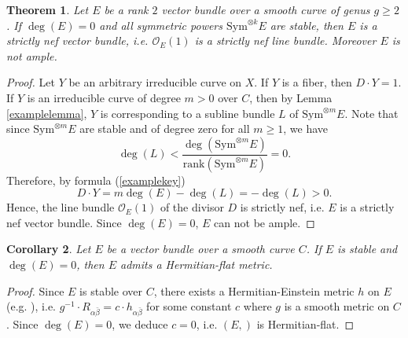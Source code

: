 \documentclass[english,reqno]{amsart}
\newcommand\sO{{\mathscr O}}
\theoremstyle{plain}
\newtheorem{thm}{Theorem}[section]
\newtheorem{cor}[thm]{Corollary}
\theoremstyle{definition}
\numberwithin{equation}{section} %
\begin{document}
\begin{thm}\cite[Chapter I, Example~ 10.6]{Hartshorne1970} Let $E$ be a rank $2$ vector bundle over a smooth curve of genus $g\geq 2$. If $\deg(E)=0$ and  all symmetric powers $ \mathrm{Sym}^{\otimes k} E$ are stable, then $E$ is a strictly nef vector bundle, i.e. $\sO_E(1)$ is a strictly nef line bundle.  Moreover $E$ is not ample.
    \end{thm}
\begin{proof}
Let $Y$ be an arbitrary irreducible curve on $X$. If $Y$
is a fiber, then $D\cdot Y=1$. If $Y$ is an irreducible curve of
degree $m>0$ over $C$, then by Lemma \ref{examplelemma}, $Y$ is
corresponding to a subline bundle $L$ of $\mathrm{Sym}^{\otimes m}E$. Note that since
$\mathrm{Sym}^{\otimes m} E$ are stable and of degree zero for all $m\geq 1$, we have
$$\deg(L)<\frac{\deg\left(\mathrm{Sym}^{\otimes m}E\right)}{\mathrm{rank}\left(\mathrm{Sym}^{\otimes m}E\right)}=0.$$
 Therefore, by
formula (\ref{examplekey}) $$ D\cdot
Y=m\deg(E)-\deg(L)=-\deg(L)>0.$$ Hence, the line bundle $\sO_E(1)$
of the divisor $D$ is strictly nef, i.e. $E$ is a  strictly nef vector bundle. Since $\deg (E)=0$, $E$ can not be ample.
\end{proof}


\begin{cor} Let $E$ be a  vector bundle over a smooth curve $C$. If $E$ is stable and $\deg(E)=0$, then $E$ admits a Hermitian-flat metric.
    \end{cor}
\begin{proof}
Since $E$ is stable over $C$, there exists a
Hermitian-Einstein metric $h$ on $E$ (e.g. \cite{UhlenbeckYau1986}), i.e. $
g^{-1}\cdot R_{\alpha\bar \beta}= c\cdot h_{\alpha\bar \beta}$
for some constant $c$ where $g$ is a smooth metric on  $C$. Since
 $\deg(E)=0$, we deduce $c=0$, i.e. $(E,)$ is Hermitian-flat.
\end{proof}
\end{document}
